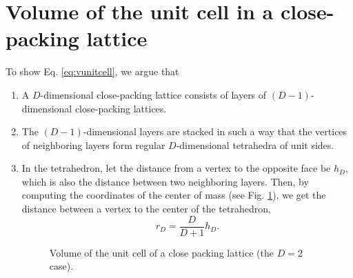 \documentclass{article}
\begin{document}
\section{Volume of the unit cell in a close-packing lattice}

To show Eq. \eqref{eq:vunitcell}, we argue that

\begin{enumerate}
\item
A $D$-dimensional close-packing lattice
consists of layers of $(D-1)$-dimensional
close-packing lattices.

\item
The $(D-1)$-dimensional layers are stacked
in such a way that the vertices of neighboring layers
form regular $D$-dimensional tetrahedra of unit sides.

\item
In the tetrahedron,
let the distance from a vertex to the opposite face
be $h_D$,
which is also the distance between two neighboring layers.
%
Then, by computing the coordinates of the center of mass
(see Fig. \ref{fig:vunitcell}),
we get the distance between a vertex to
the center of the tetrahedron,
%
\begin{equation}
  r_D
  =
  \frac{   D   }
       { D + 1 }
  h_D.
  \label{eq:rD_hD}
\end{equation}


\begin{figure}[h]
\centering
{}
\caption{
\label{fig:vunitcell}
Volume of the unit cell
of a close packing lattice
(the $D = 2$ case).}
\end{figure}


\end{enumerate}
\end{document}
